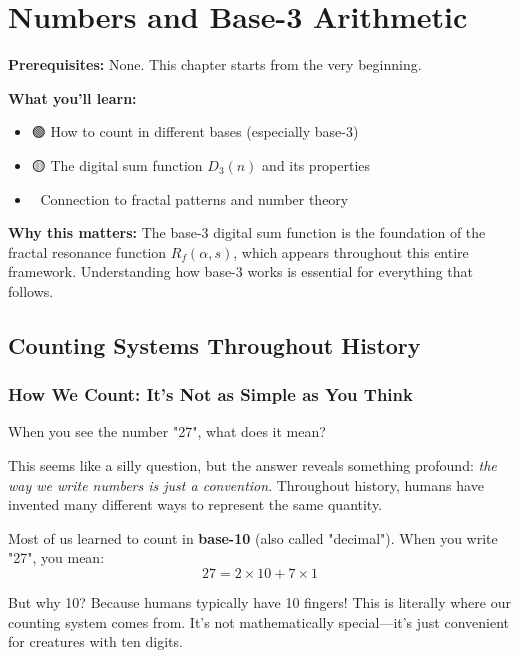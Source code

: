 \chapter{Numbers and Base-3 Arithmetic}
\label{ch:numbers}

\begin{chapterobjectives}
\textbf{Prerequisites:} None. This chapter starts from the very beginning.

\textbf{What you'll learn:}
\begin{itemize}
\item 🟢 How to count in different bases (especially base-3)
\item 🟡 The digital sum function $D_3(n)$ and its properties
\item 🔴 Connection to fractal patterns and number theory
\end{itemize}

\textbf{Why this matters:} The base-3 digital sum function is the foundation of the fractal resonance function $R_f(\alpha, s)$, which appears throughout this entire framework. Understanding how base-3 works is essential for everything that follows.
\end{chapterobjectives}

\section{Counting Systems Throughout History}
\label{sec:counting-systems}

\subsection{How We Count: It's Not as Simple as You Think}
\label{subsec:intuitive-bases}


When you see the number "27", what does it mean?

This seems like a silly question, but the answer reveals something profound: \textit{the way we write numbers is just a convention}. Throughout history, humans have invented many different ways to represent the same quantity.

\begin{intuitive}
Most of us learned to count in \textbf{base-10} (also called "decimal"). When you write "27", you mean:
\begin{equation}
27 = 2 \times 10 + 7 \times 1
\end{equation}

But why 10? Because humans typically have 10 fingers! This is literally where our counting system comes from. It's not mathematically special—it's just convenient for creatures with ten digits.
\end{intuitive}

